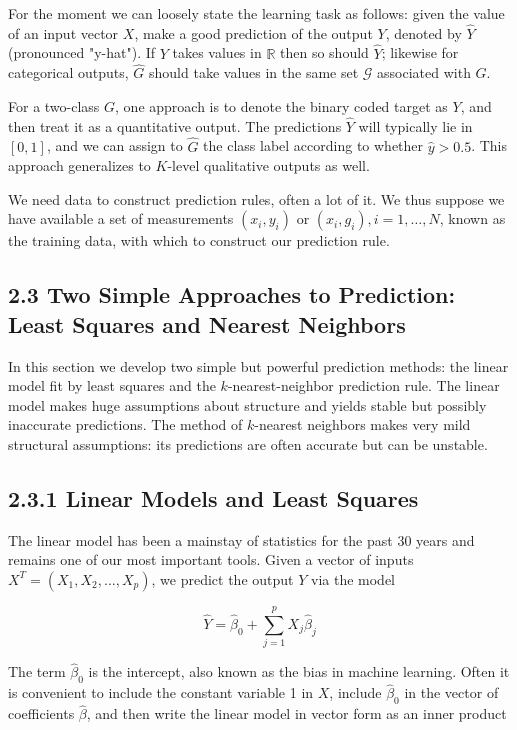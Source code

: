 \documentclass[10pt]{article}
\begin{document}
For the moment we can loosely state the learning task as follows: given the value of an input vector $X$, make a good prediction of the output $Y$, denoted by $\hat{Y}$ (pronounced "y-hat"). If $Y$ takes values in $\mathbb{R}$ then so should $\hat{Y}$; likewise for categorical outputs, $\hat{G}$ should take values in the same set $\mathcal{G}$ associated with $G$.

For a two-class $G$, one approach is to denote the binary coded target as $Y$, and then treat it as a quantitative output. The predictions $\hat{Y}$ will typically lie in $[0,1]$, and we can assign to $\hat{G}$ the class label according to whether $\hat{y}>0.5$. This approach generalizes to $K$-level qualitative outputs as well.

We need data to construct prediction rules, often a lot of it. We thus suppose we have available a set of measurements $\left(x_{i}, y_{i}\right)$ or $\left(x_{i}, g_{i}\right), i= 1, \ldots, N$, known as the training data, with which to construct our prediction rule.

\subsection*{2.3 Two Simple Approaches to Prediction: Least Squares and Nearest Neighbors}
In this section we develop two simple but powerful prediction methods: the linear model fit by least squares and the $k$-nearest-neighbor prediction rule. The linear model makes huge assumptions about structure and yields stable but possibly inaccurate predictions. The method of $k$-nearest neighbors makes very mild structural assumptions: its predictions are often accurate but can be unstable.

\subsection*{2.3.1 Linear Models and Least Squares}
The linear model has been a mainstay of statistics for the past 30 years and remains one of our most important tools. Given a vector of inputs $X^{T}=\left(X_{1}, X_{2}, \ldots, X_{p}\right)$, we predict the output $Y$ via the model


\begin{equation*}
\hat{Y}=\hat{\beta}_{0}+\sum_{j=1}^{p} X_{j} \hat{\beta}_{j} \tag{2.1}
\end{equation*}


The term $\hat{\beta}_{0}$ is the intercept, also known as the bias in machine learning. Often it is convenient to include the constant variable 1 in $X$, include $\hat{\beta}_{0}$ in the vector of coefficients $\hat{\beta}$, and then write the linear model in vector form as an inner product
\end{document}
